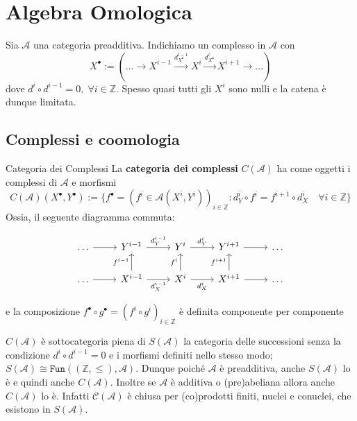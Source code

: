 \chapter{Algebra Omologica}

Sia \(\mathcal{A}\) una categoria preadditiva. Indichiamo un complesso in
\(\mathcal{A}\) con 
\[
  X^\bullet := {(\dots \to X^{i-1} \overset{d_{X^\bullet}^{i-1} }{\to} X^{i}
  \overset{d_{X^\bullet}^{i}}{\to} X^{i+1} \to \dots)}
\]
dove \(d^{i} \circ d^{i-1} = 0, \;\forall i \in \mathbb{Z}\).
Spesso quasi tutti gli \(X^{i}\) sono nulli e la catena è dunque limitata.

\section{Complessi e coomologia}

\begin{definition}{Categoria dei Complessi}
    La \textbf{categoria dei complessi} \(C{(\mathcal{A})}\) ha come oggetti i
    complessi di \(\mathcal{A}\) e morfismi
    \[
      C{(\mathcal{A})}{(X^\bullet, Y^\bullet)} := \{f^\bullet = {(f^{i} \in
      \mathcal{A}{(X^{i}, Y^{i})})}_{i \in \mathbb{Z}} : d_Y^{i} \circ f^{i} =
  f^{i+1} \circ d_X^{i} \quad \forall i \in \mathbb{Z}\} 
    \]
    Ossia, il seguente diagramma commuta:

    \[\begin{tikzcd}
        \dots & Y^{i-1} & Y^{i} & Y^{i+1} & \dots\\
        \dots & X^{i-1} & X^{i} & X^{i+1} & \dots
        \arrow[from=1-1, to=1-2]
        \arrow["{d_Y^{i-1}}", from=1-2, to=1-3]
        \arrow["{d_Y^i}", from=1-3, to=1-4]
        \arrow[from=1-4, to=1-5]
        \arrow[from=2-1, to=2-2]
        \arrow["{f^{i-1}}", from=2-2, to=1-2]
        \arrow["{d_X^{i-1}}"', from=2-2, to=2-3]
        \arrow["{f^i}", from=2-3, to=1-3]
        \arrow["{d_X^i}"', from=2-3, to=2-4]
        \arrow["{f^{i+1}}", from=2-4, to=1-4]
        \arrow[from=2-4, to=2-5]
    \end{tikzcd}\]

    e la composizione \(f^\bullet \circ g^\bullet = {(f^{i} \circ g^{i})}_{i \in
    \mathbb{Z}}\) è definita componente per componente 

\end{definition}

\begin{remark}{}
    \(C{(\mathcal{A})}\) è sottocategoria piena di \(S{(\mathcal{A})}\) la
    categoria delle successioni senza la condizione \(d^{i} \circ d^{i-1} = 0\)
    e i morfismi definiti nello stesso modo; \(S{(\mathcal{A})} \cong
    \mathtt{Fun}{({(\mathbb{Z}, \le )}, \mathcal{A})}\). Dunque poiché
    \(\mathcal{A}\) è preadditiva, anche \(S{(\mathcal{A})}\) lo è e quindi
    anche \(C{(\mathcal{A})}\). Inoltre se \(\mathcal{A}\) è additiva o
    (pre)abeliana allora anche \(C{(\mathcal{A})}\) lo è. Infatti
    \(\mathcal{C}{(\mathcal{A})}\) è chiusa per (co)prodotti finiti, nuclei e
    conuclei, che esistono in \(S{(\mathcal{A})}\).
\end{remark}

